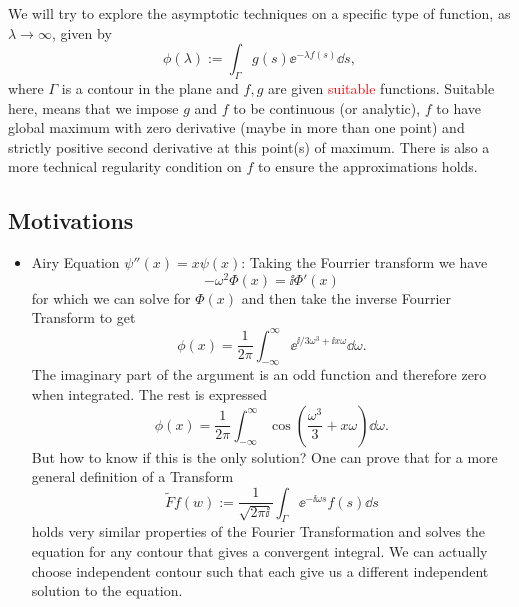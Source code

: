 We will try to explore the asymptotic techniques on a specific type of function, as $\lambda \rightarrow \infty$, given by 
\begin{equation}
	\phi(\lambda) := \int_{\Gamma} g(s) \ee^{-\lambda f(s)} \dd s,
\end{equation}
where $\Gamma$ is a contour in the plane and $f, g$ are given \textcolor{red}{suitable} functions. Suitable here, means that we impose $g$ and $f$ to be continuous (or analytic), $f$ to have global maximum with zero derivative (maybe in more than one point) and strictly positive second derivative at this point(s) of maximum. There is also a more technical regularity condition on $f$ to ensure the approximations holds.

\subsection{Motivations}

\begin{itemize}
	\item Airy Equation $\psi''(x) = x \psi(x)$: Taking the Fourrier transform we have $$-\omega^2 \Phi(x) = \ii \Phi'(x)$$ for which we can solve for $\Phi(x) $ and then take the inverse Fourrier Transform to get $$\phi(x) = \frac{1}{2\pi} \int_{-\infty}^{\infty} \ee^{\ii/3 \omega^3 + \ii x \omega} \dd \omega.$$ The imaginary part of the argument is an odd function and therefore zero when integrated. The rest is expressed $$\phi(x) = \frac{1}{2\pi} \int_{-\infty}^{\infty} \cos{\left( \frac{\omega^3}{3} + x \omega \right)} \dd \omega.$$ But how to know if this is the only solution? One can prove that for a more general definition of a Transform $$\tilde{F} f(w) := \frac{1}{\sqrt{2\pi \ii}} \int_{\Gamma} \ee^{-\ii \omega s} f(s) \dd s$$ holds very similar properties of the Fourier Transformation and solves the equation for any contour that gives a convergent integral. We can actually choose independent contour such that each give us a different independent solution to the equation.
\end{itemize}